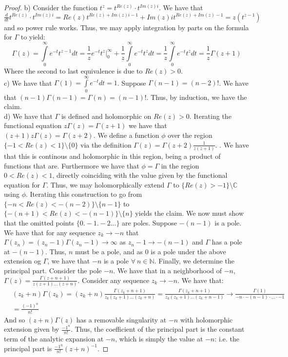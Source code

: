 \documentclass{article}
\newcommand{\bb}[1]{\mathbb{#1}}
\begin{document}
\begin{proof}
  b) Consider the function $t^{z} = t^{Re(z)}\cdot t^{Im(z)i}$. We have that $\frac{d}{dt}t^{Re(z)} \cdot t^{Im(z)i} = Re(z)t^{Re(z) + Im(z)i - 1} + Im(z)it^{Re(z) + Im(z) - 1} = z(t^{z-1})$ and so power rule works. Thus, we may apply integration by parts on the formula for $\Gamma$ to yield:
  \[
    \Gamma(z) = \int\limits_{0}^{\infty}e^{-t}t^{z-1} dt = \frac{1}{z}e^{-t}t^{z}|_{0}^{\infty} + \frac{1}{z}\int\limits_{0}^{\infty}e^{-t}t^{z}dt = \frac{1}{z}\int\limits_{0}^{\infty}e^{-t}t^{z} dt = \frac{1}{z}\Gamma(z+1)
  \]
  Where the second to last equivalence is due to $Re(z) > 0$. \\
  c) We have that $\Gamma(1) = \int\limits_{0}^{\infty}e^{-t}dt = 1$. Suppose $\Gamma(n-1) = (n-2)!$. We have that $(n-1)\Gamma(n-1) = \Gamma(n) = (n-1)!$. Thus, by induction, we have the claim. \\
  d) We have that $\Gamma$ is defined and holomorphic on $Re(z) > 0$.  Iterating the functional equation $z\Gamma(z) = \Gamma(z+1)$ we have that $(z+1)z\Gamma(z) = \Gamma(z+2)$. We define a function $\phi$ over the region $\{-1<Re(z)<1\} \setminus \{0\}$ via the definition $\Gamma(z) = \Gamma(z+2)\frac{1}{z(z+1)}$. . We have that this is continous and holomorphic in this region, being a product of functions that are. Furthermore we have that $\phi = \Gamma$ in the region $0 < Re(z) < 1$, directly coinciding with the value given by the functional equation for $\Gamma$. Thus, we may holomorphically extend $\Gamma$ to $\{Re(z) > -1\} \setminus \bb{C}$ using $\phi$. Iterating this construction to go from $\{-n < Re(z) < -(n-2)\} \setminus \{n-1\}$ to $\{-(n+1) < Re(z) < -(n-1)\} \setminus \{n\}$ yields the claim. We now must show that the omitted points $\{0.-1.-2...\}$ are poles. Suppose $-(n-1)$ is a pole. We have that for any sequence $z_{k} \to -n$ that $\Gamma(z_{n}) = (z_{n}-1)\Gamma(z_{n}-1) \to \infty$ as $z_{n}-1 \to -(n-1)$ and $\Gamma$ has a pole at $-(n-1)$. Thus, $n$ must be a pole, and as $0$ is a pole under the above extension og $\Gamma$, we have that $-n$ is a pole $\forall \ n \in \bb{N}$. Finally, we determine the principal part. Consider the pole $-n$. We have that in a neighborhood of $-n$, $\Gamma(z) = \frac{\Gamma(z+n+1)}{z(z+1)...(z+n)}$. Consider any sequence $z_{k} \to -n$. We have that:
  \begin{align*}
    &(z_{k}+n)\Gamma(z_{k}) = (z_{k}+n)\frac{\Gamma(z_{k}+n+1)}{z_{k}(z_{k}+1)...(z_{k}+n)} = \frac{\Gamma(z_{k}+n+1)}{z_{k}(z_{k}+1)...(z_{k}+n-1)} \to \frac{\Gamma(1)}{-n \cdot -(n-1) \cdot ... \cdot -1} \\
    & = \frac{(-1)^{n}}{n!}
  \end{align*}
  And so $(z+n)\Gamma(z)$ has a removable singularity at $-n$ with holomorphic extension given by $\frac{-1^{n}}{n!}$. Thus, the coefficient of the principal part is the constant term of the analytic expansion at $-n$, which is simply the value at $-n$: i.e. the principal part is $\frac{-1^{n}}{n!}(z+n)^{-1}$. 
\end{proof}
\end{document}
